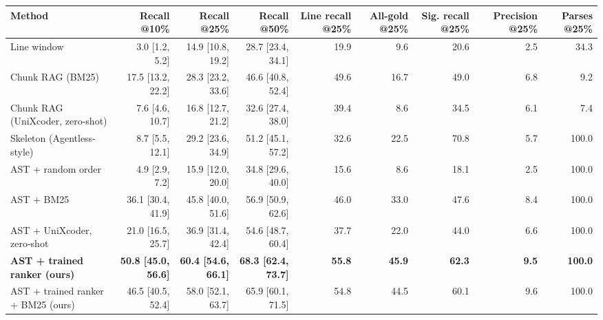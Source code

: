 \begin{tabular}{lrrrrrrrr}
\toprule
Method & Recall @10\% & Recall @25\% & Recall @50\% & Line recall @25\% & All-gold @25\% & Sig. recall @25\% & Precision @25\% & Parses @25\% \\
\midrule
Line window & 3.0 [1.2, 5.2] & 14.9 [10.8, 19.2] & 28.7 [23.4, 34.1] & 19.9 & 9.6 & 20.6 & 2.5 & 34.3 \\
Chunk RAG (BM25) & 17.5 [13.2, 22.2] & 28.3 [23.2, 33.6] & 46.6 [40.8, 52.4] & 49.6 & 16.7 & 49.0 & 6.8 & 9.2 \\
Chunk RAG (UniXcoder, zero-shot) & 7.6 [4.6, 10.7] & 16.8 [12.7, 21.2] & 32.6 [27.4, 38.0] & 39.4 & 8.6 & 34.5 & 6.1 & 7.4 \\
Skeleton (Agentless-style) & 8.7 [5.5, 12.1] & 29.2 [23.6, 34.9] & 51.2 [45.1, 57.2] & 32.6 & 22.5 & 70.8 & 5.7 & 100.0 \\
AST + random order & 4.9 [2.9, 7.2] & 15.9 [12.0, 20.0] & 34.8 [29.6, 40.0] & 15.6 & 8.6 & 18.1 & 2.5 & 100.0 \\
AST + BM25 & 36.1 [30.4, 41.9] & 45.8 [40.0, 51.6] & 56.9 [50.9, 62.6] & 46.0 & 33.0 & 47.6 & 8.4 & 100.0 \\
AST + UniXcoder, zero-shot & 21.0 [16.5, 25.7] & 36.9 [31.4, 42.4] & 54.6 [48.7, 60.4] & 37.7 & 22.0 & 44.0 & 6.6 & 100.0 \\
\textbf{AST + trained ranker (ours)} & \textbf{50.8 [45.0, 56.6]} & \textbf{60.4 [54.6, 66.1]} & \textbf{68.3 [62.4, 73.7]} & \textbf{55.8} & \textbf{45.9} & \textbf{62.3} & \textbf{9.5} & \textbf{100.0} \\
AST + trained ranker + BM25 (ours) & 46.5 [40.5, 52.4] & 58.0 [52.1, 63.7] & 65.9 [60.1, 71.5] & 54.8 & 44.5 & 60.1 & 9.6 & 100.0 \\
\bottomrule
\end{tabular}
